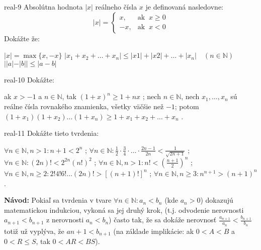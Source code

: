 \begin{defproblem}{real-9}
Absolútna hodnota $|x|$ reálneho čísla $x$ je definovaná nasledovne:
\[
  |x| =
    \begin{cases}
      x,  & \text{ak } ~x \geq 0 \\
      -x, & \text{ak } ~x < 0
    \end{cases}
\]
Dokážte že:
\begin{tasks}
  \task $|x| = \max{\{x, -x\}}$
  \task $|x_1 + x_2 + \ldots + x_n| \leq |x1| + |x2| + \ldots + |x_n| \quad (n \in \mathbb{N})$
  \task $||a| - |b|| \leq |a - b|$
\end{tasks}
\end{defproblem}

\begin{defproblem}{real-10}
Dokážte:

\begin{tasks}
  \task ak $x > -1$ a $n \in \mathbb{N}$, tak $(1 + x)^n \geq 1 + nx$ ;
  \task nech $n \in \mathbb{N}$, nech $x_1, \ldots, x_n$ sú reálne čísla
        rovnakého znamienka, všetky väčšie než $-1$; potom
        $(1 + x_1)(1 + x_2) \ldots (1 + x_n) \geq 1 + x_1 + x_2 + \ldots + x_n$ .
\end{tasks}
\end{defproblem}

\begin{defproblem}{real-11}
Dokážte tieto tvrdenia:

\begin{tasks}
  \task $\forall n \in \mathbb{N}, n > 1: n + 1 < 2^n$ ;
  \task $\forall n \in \mathbb{N}: \frac{1}{2} \cdot \frac{3}{4} \cdot \ldots
         \cdot \frac{2n - 1}{2n} < \frac{1}{\sqrt{2n + 1}}$ ;
  \task $\forall n \in \mathbb{N}: (2n)! < 2^{2n} (n!)^2$ ;
  \task $\forall n \in \mathbb{N}, n > 1: n! < (\frac{n + 1}{2})^n$ ;
  \task $\forall n \in \mathbb{N}, n \geq 2: 2! 4! 6! \ldots (2n)!
          > [(n+1)!]^n$ ;
  \task $\forall n \in \mathbb{N}, n \geq 3: n^{n+1} > (n+1)^n$ .
\end{tasks}

{\footnotesize \textbf{Návod:} Pokiaľ sa tvrdenia v tvare $\forall n \in \mathbb{N}: a_n < b_n$
(kde $a_n > 0$) dokazujú matematickou indukciou, vykoná sa jej druhý krok,
(t.j. odvodenie nerovnosti $a_{n+1} < b_{n+1}$ z nerovnosti $a_n < b_n$) často
tak, že sa dokáže nerovnosť $\frac{a_{n + 1}}{a_n} < \frac{b_{n + 1}}{b_n}$
totiž už vyplýva, že $a{n + 1} < b_{n+1}$ (na základe implikácie: ak
$0 < A < B$ a $0 < R \leq S$, tak  $0 < AR < BS$).}
\end{defproblem}

